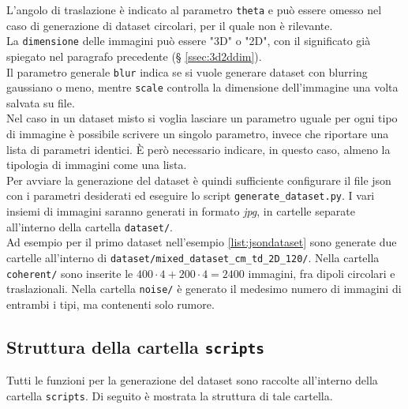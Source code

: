 L'angolo di traslazione è indicato al parametro \texttt{theta} e può essere omesso nel caso di generazione di dataset circolari, per il quale non è rilevante.\\ La \texttt{dimensione} delle immagini può essere "3D" o "2D", con il significato già spiegato nel paragrafo precedente (§ \ref{ssec:3d2ddim}). \\ Il parametro generale \texttt{blur} indica se si vuole generare dataset con blurring gaussiano o meno, mentre \texttt{scale} controlla la dimensione dell'immagine una volta salvata su file.\\
Nel caso in un dataset misto si voglia lasciare un parametro uguale per ogni tipo di immagine è possibile scrivere un singolo parametro, invece che riportare una lista di parametri identici. È però necessario indicare, in questo caso, almeno la tipologia di immagini come una lista.\\

Per avviare la generazione del dataset è quindi sufficiente configurare il file json con i parametri desiderati ed eseguire lo script \texttt{generate\_dataset.py}. I vari insiemi di immagini saranno generati in formato \textit{jpg}, in cartelle separate all'interno della cartella \texttt{dataset/}.\\
Ad esempio per il primo dataset nell'esempio \ref{list:jsondataset} sono generate due cartelle all'interno di \texttt{dataset/mixed\_dataset\_cm\_td\_2D\_120/}. Nella cartella \texttt{coherent/} sono inserite le $400 \cdot 4 + 200 \cdot 4 = 2400$ immagini, fra dipoli circolari e traslazionali. Nella cartella \texttt{noise/} è generato il medesimo numero di immagini di entrambi i tipi, ma contenenti solo rumore.

\subsection{Struttura della cartella \texttt{scripts}}

Tutti le funzioni per la generazione del dataset sono raccolte all'interno della cartella \texttt{scripts}. Di seguito è mostrata la struttura di tale cartella. \\

\begin{folder}
	\mbox{}\\
\end{folder}



